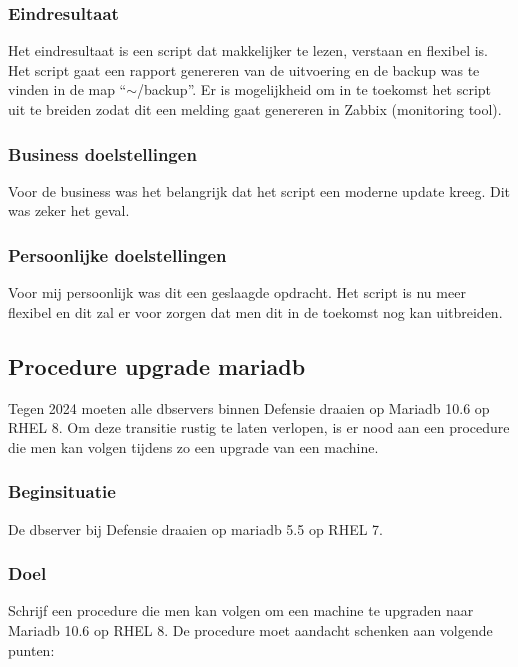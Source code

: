 \subsubsection{Eindresultaat}

Het eindresultaat is een script dat makkelijker te lezen, verstaan en flexibel is. Het script gaat een rapport genereren van de uitvoering en de backup was te vinden in de map ``$\sim$/backup''. Er is mogelijkheid om in te toekomst het script uit te breiden zodat dit een melding gaat genereren in Zabbix (monitoring tool).

\subsubsection{Business doelstellingen}

Voor de business was het belangrijk dat het script een moderne update kreeg. Dit was zeker het geval.

\subsubsection{Persoonlijke doelstellingen}

Voor mij persoonlijk was dit een geslaagde opdracht. Het script is nu meer flexibel en dit zal er voor zorgen dat men dit in de toekomst nog kan uitbreiden.


\pagebreak

\subsection{Procedure upgrade mariadb}

Tegen 2024 moeten alle dbservers binnen Defensie draaien op Mariadb 10.6 op RHEL 8. Om deze transitie rustig te laten verlopen, is er nood aan een procedure die men kan volgen tijdens zo een upgrade van een machine.

\subsubsection{Beginsituatie}

De dbserver bij Defensie draaien op mariadb 5.5 op RHEL 7.

\subsubsection{Doel}

Schrijf een procedure die men kan volgen om een machine te upgraden naar Mariadb 10.6 op RHEL 8. De procedure moet aandacht schenken aan volgende punten:

